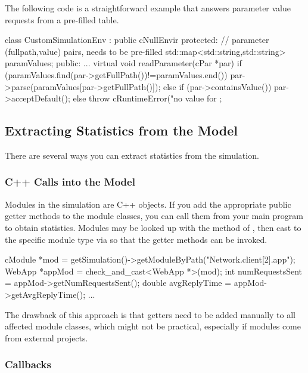 The following code is a straightforward example that answers parameter
value requests from a pre-filled table.

\begin{cpp}
class CustomSimulationEnv : public cNullEnvir
{
  protected:
    // parameter (fullpath,value) pairs, needs to be pre-filled
    std::map<std::string,std::string> paramValues;
  public:
    ...
    virtual void readParameter(cPar *par) {
        if (paramValues.find(par->getFullPath())!=paramValues.end())
            par->parse(paramValues[par->getFullPath()]);
        else if (par->containsValue())
            par->acceptDefault();
        else
            throw cRuntimeError("no value for %
    }
};
\end{cpp}


\subsection{Extracting Statistics from the Model}
\label{sec:embedding:extracting-statistics}

There are several ways you can extract statistics from the
simulation.

\subsubsection{C++ Calls into the Model}
\label{sec:embedding:statistics-via-cpp-calls}

Modules in the simulation are C++ objects. If you add the appropriate
public getter methods to the module classes, you can call them from your
main program to obtain statistics. Modules may be looked up with the
 method of , then cast to the
specific module type via  so that the getter
methods can be invoked.

\begin{cpp}
cModule *mod = getSimulation()->getModuleByPath("Network.client[2].app");
WebApp *appMod = check_and_cast<WebApp *>(mod);
int numRequestsSent = appMod->getNumRequestsSent();
double avgReplyTime = appMod->getAvgReplyTime();
...
\end{cpp}

The drawback of this approach is that getters need to be added manually
to all affected module classes, which might not be practical, especially
if modules come from external projects.

\subsubsection{ Callbacks}
\label{sec:embedding:statistics-via-cenvir-callbacks}

